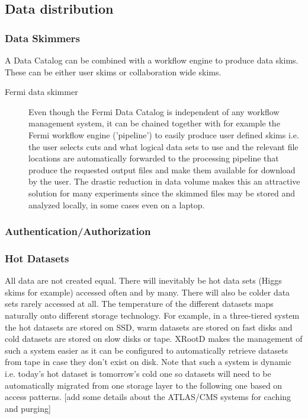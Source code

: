 \subsection{Data distribution}

\subsubsection{Data Skimmers}
A Data Catalog can be combined with a workflow engine to produce data skims. These can be either user skims or collaboration 
wide skims. 

\begin{description}
\item[Fermi data skimmer] Even though the Fermi Data Catalog is independent of any workflow management system, it 
can be chained together with for example the Fermi workflow engine ('pipeline') to easily produce user defined skims 
i.e. the user selects cuts and what logical data sets to use and the relevant file locations are automatically 
forwarded to the processing pipeline that produce the requested output files and make them available for download 
by the user. The drastic reduction in data volume makes this an attractive solution for many experiments since the skimmed files 
may be stored and analyzed locally, in some cases even on a laptop.
\end{description}

\subsubsection{Authentication/Authorization} 


\subsubsection{Hot Datasets}
All data are not created equal. There will inevitably be hot data sets (Higgs skims for example) accessed often and by 
many. There will also be colder data sets rarely accessed at all. The temperature of the different datasets maps  
naturally onto different storage technology. For example, in a three-tiered system the hot datasets are stored on SSD, 
warm datasets are stored on fast disks and cold datasets are stored on slow disks or tape. XRootD makes the 
management of such a system easier as it can be configured to automatically retrieve datasets from tape in case they 
don't exist on disk. Note that such a system is dynamic i.e. today's hot dataset is tomorrow's cold one so datasets will 
need to be automatically migrated from one storage layer to the following one based on access patterns. [add some details 
about the ATLAS/CMS systems for caching and purging] 



